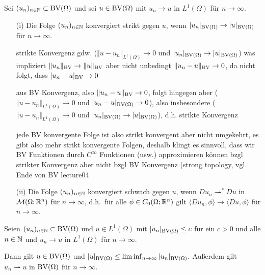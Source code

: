 \begin{definition}
  Sei $(u_n)_{n\in\mathbb{N}}\subset \textup{BV}(\Omega)$ und sei $u\in \textup{BV}(\Omega)$ mit
  $u_n\rightarrow u$ in $L^1(\Omega)$ für $n\rightarrow\infty$.
  \begin{itemize}
    \item[(i)]
      Die Folge $(u_n)_{n\in\mathbb{N}}$ konvergiert strikt gegen $u$,
      wenn $|u_n|_{\textup{BV}(\Omega)}\rightarrow |u|_{\textup{BV}(\Omega)}$ für $n\rightarrow\infty$.
      {\color{red} strikte Konvergenz gdw. ($\Vert u-u_n\Vert_{L^1(\Omega)}
      \to 0$ und $|u_n|_{\textup{BV}(\Omega)}\rightarrow |u|_{\textup{BV}(\Omega)}$)
      was impliziert $\Vert u_n\Vert_{\textup{BV}}\to \Vert u\Vert_{\textup{BV}}$ aber nicht
      unbedingt $\Vert u_n - u \Vert_{\textup{BV}}\to 0$, da nicht folgt, dass 
      $|u_n - u|_{\textup{BV}}\to 0$
      
      aus BV Konvergenz, also $\Vert u_n - u \Vert_{\textup{BV}}\to 0$, folgt hingegen 
      aber ($\Vert u-u_n\Vert_{L^1(\Omega)}
      \to 0$ und $|u_n - u|_{\textup{BV}(\Omega)}\rightarrow 0$), also insbesondere
      ($\Vert u-u_n\Vert_{L^1(\Omega)}
      \to 0$ und $|u_n|_{\textup{BV}(\Omega)}\rightarrow |u|_{\textup{BV}(\Omega)}$), d.h.
      strikte Konvergenz
      
      jede BV konvergente Folge ist also strikt konvergent aber nicht umgekehrt,
      es gibt also mehr strikt konvergente Folgen, deshalb klingt es sinnvoll,
      dass wir BV Funktionen durch $C^\infty$ Funktionen (usw.) approximieren
      können bzgl strikter Konvergenz aber nicht bzgl BV Konvergenz (strong 
      topology, vgl.  Ende von BV lecture04}
    \item[(ii)] Die Folge $(u_n)_{n\in\mathbb{N}}$ konvergiert
      schwach gegen $u$, wenn
      $Du_n\rightharpoonup^\ast Du$ in 
      $\mathcal{M}(\Omega;\mathbb{R}^n)$ für $n\rightarrow\infty$, d.h.\ für alle
      $\phi\in C_0(\Omega;\mathbb{R}^n)$ gilt 
      $\langle Du_n,\phi\rangle\rightarrow \langle Du,\phi\rangle$ für 
      $n\rightarrow\infty$.
  \end{itemize}
\end{definition}

\begin{theorem}
  \label{thm:wlsc}
  Seien $(u_n)_{n\in\mathbb{N}}\subset\textup{BV}(\Omega)$ und $u\in L^1(\Omega)$ mit
  $|u_n|_{\textup{BV}(\Omega)}\leq c$ für ein $c>0$ und alle $n\in\mathbb{N}$ und
  $u_n\rightarrow u$ in $L^1(\Omega)$ für $n\rightarrow\infty$.

  Dann gilt $u\in\textup{BV}(\Omega)$ und $|u|_{\textup{BV}(\Omega)}\leq
  \liminf_{n\rightarrow\infty}|u_n|_{\textup{BV}(\Omega)}.$
  Außerdem gilt $u_n\rightharpoonup u$ in $\textup{BV}(\Omega)$ für $n\rightarrow
  \infty$.
\end{theorem}

